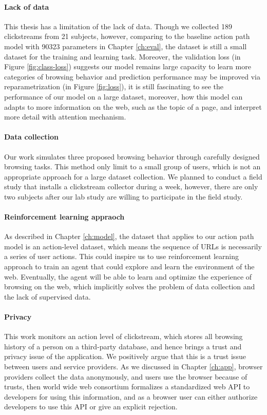 \paragraph{Lack of data} 
This thesis has a limitation of the lack of data. 
Though we collected 189 clickstreams from 21 subjects, however, 
comparing to the baseline action path model with 90323 parameters in Chapter \ref{ch:eval},
the dataset is still a small dataset for the training and learning task.
Moreover, the validation loss (in Figure \ref{fig:class-loss}) suggests our model remains 
large capacity to learn more
categories of browsing behavior and prediction performance may be improved
via reparametrization (in Figure \ref{fig:loss}), 
it is still fascinating to see the performance of our model on a large dataset,
moreover, how this model can adapts to more information on the web, such as the topic of 
a page, and interpret more detail with attention mechanism.

\paragraph{Data collection}
Our work simulates three proposed browsing behavior through carefully designed browsing tasks.
This method only limit to a small group of users, which is not an appropriate approach for
a large dataset collection.
We planned to conduct a field study that installs a clickstream collector during a week, 
however, there are only two subjects after our lab study
are willing to participate in the field study.

\paragraph{Reinforcement learning appraoch}
As described in Chapter \ref{ch:model}, the dataset that applies to our action path model
is an action-level dataset, which means the sequence of URLs is necessarily a series of 
user actions. This could inspire us to use reinforcement learning approach to train
an agent that could explore and learn the environment of the web. Eventually,
the agent will be able to learn and optimize the experience of browsing on the web,
which implicitly solves the problem of data collection and the lack of supervised data.

\paragraph{Privacy}
This work monitors an action level of clickstream, which stores all browsing history of 
a person on a third-party database, and hence brings a trust and privacy issue of
the application. We positively argue that this is a trust issue between users and service providers.
As we discussed in Chapter \ref{ch:app}, browser providers collect the data anonymously,
and users use the browser because of trusts, then world wide web consortium formalizes
a standardized web API to developers for using this information, and as a browser user can
either authorize developers to use this API or give an explicit rejection.

